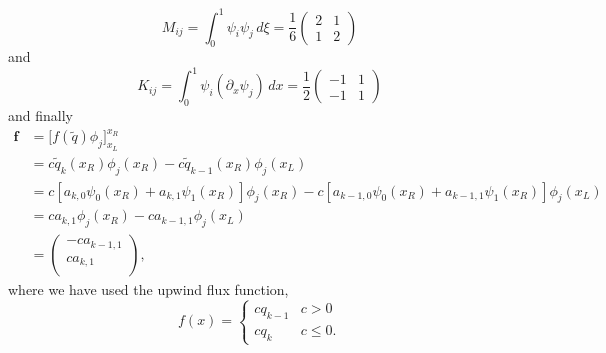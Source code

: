 \documentclass[12pt]{article}
\numberwithin{equation}{section}
\begin{document}
\clearpage
\begin{equation}
M_{ij} = \int_0^1 \psi_i \psi_j \, d \xi = \frac{1}{6}
\begin{pmatrix}
2 & 1 \\
1 & 2
\end{pmatrix}
\end{equation}
and
\begin{equation}
K_{ij} = \int_0^1 \psi_i (\partial_x \psi_j) \, dx = \frac{1}{2}
\begin{pmatrix}
-1 & 1 \\
-1 & 1
\end{pmatrix}
\end{equation}
and finally
\begin{equation}
\begin{aligned}
\bm{f} &= \big[ f(\tilde{q}) \phi_j \big]^{x_R}_{x_L} \\
&=  c \tilde{q}_{k}(x_R) \phi_j(x_R) - c \tilde{q}_{k-1}(x_R) \phi_j(x_L) \\
&=  c [a_{k,0} \psi_0(x_R) + a_{k,1} \psi_1(x_R)] \phi_j(x_R) - c [a_{k-1,0} \psi_0(x_R) + a_{k-1,1} \psi_1(x_R)] \phi_j(x_L) \\
&=  c a_{k,1} \phi_j(x_R) - c a_{k-1,1} \phi_j(x_L) \\
&=
\begin{pmatrix}
- c a_{k-1,1} \\
c a_{k,1} \\
\end{pmatrix},
\end{aligned}
\end{equation}
where we have used the upwind flux function,
\begin{equation}
f(x) =
\begin{cases}
c q_{k-1} & c > 0 \\
c q_{k}   & c \leq 0.
\end{cases}
\end{equation}
\end{document}

